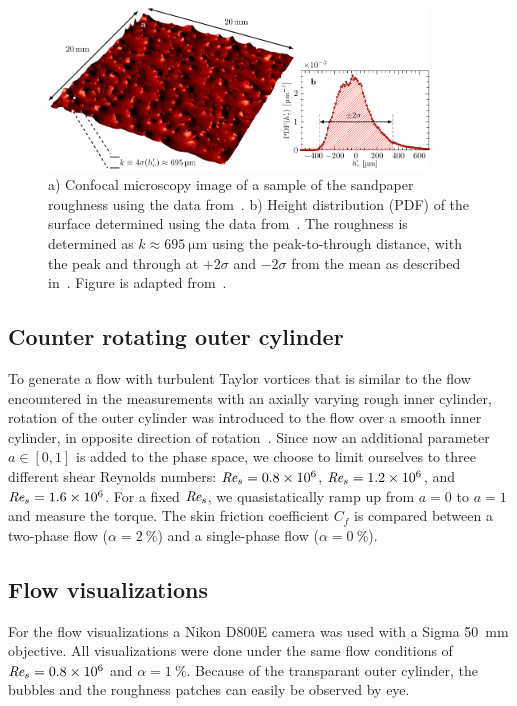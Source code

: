 \documentclass[aps,twocolumn,10pt,floatfix, superscriptaddress,longbibliography,pra]{revtex4-1}
\newcommand\Rey{\mbox{\textit{Re$_s$}}}  %
\newcommand{\perc}[1]{ \SI{#1}{\percent} }
\newcommand{\e}[1]{\times 10^{#1}}
\begin{document}
\begin{figure}
    \centering
    \includegraphics[width=0.9\textwidth]{./figures/fig2_roughness}
    \caption{a) Confocal microscopy image of a sample of the sandpaper roughness using the data from~\cite{Bakhuis2019}. b) Height distribution (PDF) of the surface determined using the data from~\cite{Bakhuis2019}. The roughness is determined as $k \approx \SI{695}{\micro\metre}$ using the peak-to-through distance, with the peak and through at $+2\sigma$ and $-2\sigma$ from the mean as described in~\citep{Bakhuis2019}. Figure is adapted from~\citep{Bakhuis2019}.}
    \label{fig:roughness_height}
\end{figure}

\subsection{Counter rotating outer cylinder}
To generate a flow with turbulent Taylor vortices that is similar to the flow encountered in the measurements with an axially varying rough inner cylinder, rotation of the outer cylinder was introduced to the flow over a smooth inner cylinder, in opposite direction of rotation~\citep{Huisman2014}. Since now an additional parameter $a \in [0,1]$ is added to the phase space, we choose to limit ourselves to three different shear Reynolds numbers: $\Rey = 0.8\e{6}$, $\Rey = 1.2\e{6}$, and $\Rey = 1.6\e{6}$. For a fixed $\Rey$, we quasistatically ramp up from $a = 0$ to $a=1$ and measure the torque. The skin friction coefficient $C_f$ is compared between a two-phase flow ($\alpha =\perc{2}$) and a single-phase flow ($\alpha=\perc{0}$).

\subsection{Flow visualizations}
For the flow visualizations a Nikon D800E camera was used with a Sigma \SI{50}{mm} objective. All visualizations were done under the same flow conditions of $\Rey = 0.8 \e{6}$ and $\alpha = \SI{1}{\percent}$. Because of the transparant outer cylinder, the bubbles and the roughness patches can easily be observed by eye.
\end{document}
